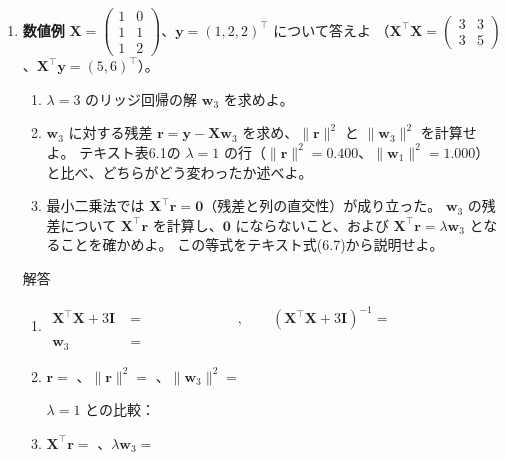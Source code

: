 \documentclass[a4paper,dvipdfmx]{jsarticle}
\newcommand{\提出期限}{2026年11月2日（月）}
\newcommand{\学籍番号}{0000000}
\newcommand{\氏名}{氏名を書く}
\newcommand{\提出日}{2026年11月2日}
\newenvironment{answer}{\begin{itembox}[l]{解答}}{\end{itembox}}
\begin{document}
\begin{enumerate}
  \item \textbf{数値例}\quad
    $\bm{X} = \begin{pmatrix} 1 & 0 \\ 1 & 1 \\ 1 & 2 \end{pmatrix}$、$\bm{y} = (1, 2, 2)^\top$ について答えよ
    （$\bm{X}^\top\bm{X} = \begin{pmatrix} 3 & 3 \\ 3 & 5 \end{pmatrix}$、$\bm{X}^\top\bm{y} = (5, 6)^\top$）。
    \begin{enumerate}
      \item $\lambda = 3$ のリッジ回帰の解 $\bm{w}_3$ を求めよ。
      \item $\bm{w}_3$ に対する残差 $\bm{r} = \bm{y} - \bm{X}\bm{w}_3$ を求め、$\|\bm{r}\|^2$ と $\|\bm{w}_3\|^2$ を計算せよ。
        テキスト表6.1の $\lambda = 1$ の行（$\|\bm{r}\|^2 = 0.400$、$\|\bm{w}_1\|^2 = 1.000$）と比べ、どちらがどう変わったか述べよ。
      \item 最小二乗法では $\bm{X}^\top\bm{r} = \bm{0}$（残差と列の直交性）が成り立った。
        $\bm{w}_3$ の残差について $\bm{X}^\top\bm{r}$ を計算し、$\bm{0}$ にならないこと、および $\bm{X}^\top\bm{r} = \lambda\bm{w}_3$ となることを確かめよ。
        この等式をテキスト式(6.7)から説明せよ。
    \end{enumerate}
    \begin{answer}
      \begin{enumerate}
        \item
          \begin{align*}
            \bm{X}^\top\bm{X} + 3\bm{I} &= \phantom{XXXXXXXX}, \qquad
            (\bm{X}^\top\bm{X} + 3\bm{I})^{-1} = \phantom{XXXXXXXXXX} \\
            \bm{w}_3 &= \phantom{XXXXXXXXXXXXXXXX}
          \end{align*}
        \item $\bm{r} = $ \phantom{XXXXXXXXXX}、$\|\bm{r}\|^2 = $ \phantom{XXXX}、$\|\bm{w}_3\|^2 = $ \phantom{XXXX}
          \vspace{4mm}

          $\lambda = 1$ との比較：
          \vspace{8mm}
        \item $\bm{X}^\top\bm{r} = $ \phantom{XXXXXXXX}、$\lambda\bm{w}_3 = $ \phantom{XXXXXXXX}
          \vspace{4mm}


\end{enumerate}
\end{answer}
\end{enumerate}
\end{document}
